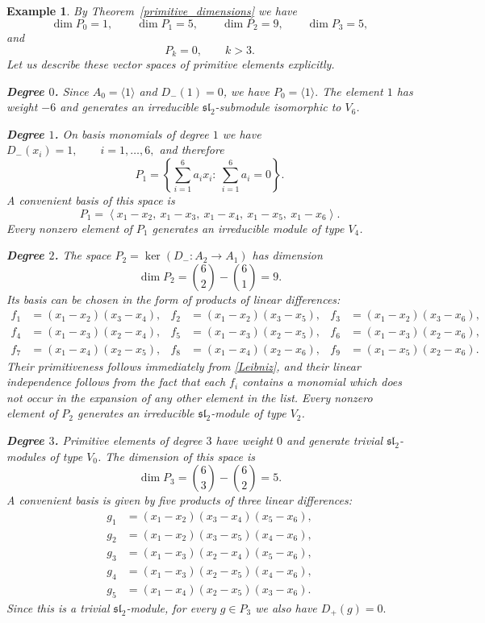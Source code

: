 \documentclass[10pt,a4paper]{amsart}
\newtheorem{example}{Example}[section]
\begin{document}
\begin{example}
{\rm
By Theorem~\ref{primitive_dimensions} we have
$$
\dim P_0=1,\qquad
\dim P_1=5,\qquad
\dim P_2=9,\qquad
\dim P_3=5,
$$
and
$$
P_k=0,\qquad k>3.
$$
Let us describe these vector spaces of primitive elements explicitly.

\medskip

\noindent\textbf{Degree $0$.}
Since $A_0=\langle 1\rangle$ and $D_-(1)=0$, we have
$
P_0=\langle 1\rangle.
$
The element $1$ has weight $-6$ and generates an irreducible
$\mathfrak{sl}_2$-submodule isomorphic to $V_6$.

\medskip

\noindent\textbf{Degree $1$.}
On basis monomials of degree $1$ we have
$
D_-(x_i)=1,\qquad i=1,\dots,6,
$
and therefore
$$
P_1=\left\{\sum_{i=1}^6 a_i x_i:\ \sum_{i=1}^6 a_i=0\right\}.
$$
A convenient basis of this space is
$$
P_1=
\left\langle
x_1-x_2,\ x_1-x_3,\ x_1-x_4,\ x_1-x_5,\ x_1-x_6
\right\rangle.
$$
Every nonzero element of $P_1$ generates an irreducible module of type $V_4$.

\medskip

\noindent\textbf{Degree $2$.}
The space $P_2=\ker(D_-:A_2\to A_1)$ has dimension
$$
\dim P_2=\binom62-\binom61=9.
$$
Its basis can be chosen in the form of products of linear differences:
$$
\begin{aligned}
f_1&=(x_1-x_2)(x_3-x_4),&
f_2&=(x_1-x_2)(x_3-x_5),&
f_3&=(x_1-x_2)(x_3-x_6),\\
f_4&=(x_1-x_3)(x_2-x_4),&
f_5&=(x_1-x_3)(x_2-x_5),&
f_6&=(x_1-x_3)(x_2-x_6),\\
f_7&=(x_1-x_4)(x_2-x_5),&
f_8&=(x_1-x_4)(x_2-x_6),&
f_9&=(x_1-x_5)(x_2-x_6).
\end{aligned}
$$
Their primitiveness follows immediately from \eqref{Leibniz}, and their
linear independence follows from the fact that each $f_i$ contains a monomial
which does not occur in the expansion of any other element in the list.
Every nonzero element of $P_2$ generates an irreducible
$\mathfrak{sl}_2$-module of type $V_2$.

\medskip

\noindent\textbf{Degree $3$.}
Primitive elements of degree $3$ have weight $0$ and generate trivial
$\mathfrak{sl}_2$-modules of type $V_0$. The dimension of this space is
$$
\dim P_3=\binom63-\binom62=5.
$$
A convenient basis is given by five products of three linear differences:
$$
\begin{aligned}
g_1&=(x_1-x_2)(x_3-x_4)(x_5-x_6),\\
g_2&=(x_1-x_2)(x_3-x_5)(x_4-x_6),\\
g_3&=(x_1-x_3)(x_2-x_4)(x_5-x_6),\\
g_4&=(x_1-x_3)(x_2-x_5)(x_4-x_6),\\
g_5&=(x_1-x_4)(x_2-x_5)(x_3-x_6).
\end{aligned}
$$
Since this is a trivial $\mathfrak{sl}_2$-module, for every $g\in P_3$ we
also have
$
D_+(g)=0.
$

}
\end{example}
\end{document}
